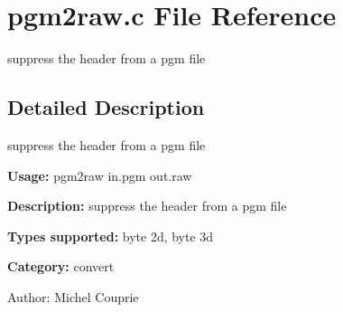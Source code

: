 \section{pgm2raw.c File Reference}
\label{pgm2raw_8c}
suppress the header from a pgm file  




\label{_details}
\subsection{Detailed Description}
suppress the header from a pgm file 

{\bf Usage:} pgm2raw in.pgm out.raw

{\bf Description:} suppress the header from a pgm file

{\bf Types supported:} byte 2d, byte 3d

{\bf Category:} convert

\begin{Desc}
\item[Author:]Michel Couprie \end{Desc}
